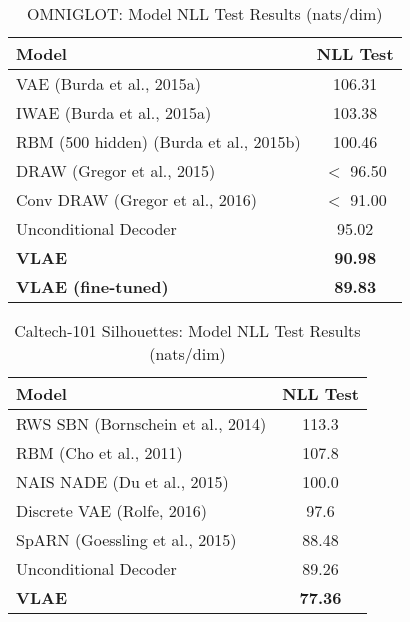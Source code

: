 \documentclass[12pt]{article}
\begin{document}
\begin{table}[H]
    \centering
    \caption{OMNIGLOT: Model NLL Test Results (nats/dim)}
    \label{tab:omniglot}
    \begin{tabular}{lc}
    \toprule
    \textbf{Model} & \textbf{NLL Test} \\
    \midrule
    VAE (Burda et al., 2015a) & 106.31 \\
    IWAE (Burda et al., 2015a) & 103.38 \\
    RBM (500 hidden) (Burda et al., 2015b) & 100.46 \\
    DRAW (Gregor et al., 2015) & $<$ 96.50 \\
    Conv DRAW (Gregor et al., 2016) & $<$ 91.00 \\
    Unconditional Decoder & 95.02 \\
    \textbf{VLAE} & \textbf{90.98} \\
    \textbf{VLAE (fine-tuned)} & \textbf{89.83} \\
    \bottomrule
    \end{tabular}
\end{table}

\begin{table}[H]
    \centering
    \caption{Caltech-101 Silhouettes: Model NLL Test Results (nats/dim)}
    \label{tab:caltech}
    \begin{tabular}{lc}
    \toprule
    \textbf{Model} & \textbf{NLL Test} \\
    \midrule
    RWS SBN (Bornschein et al., 2014) & 113.3 \\
    RBM (Cho et al., 2011) & 107.8 \\
    NAIS NADE (Du et al., 2015) & 100.0 \\
    Discrete VAE (Rolfe, 2016) & 97.6 \\
    SpARN (Goessling et al., 2015) & 88.48 \\
    Unconditional Decoder & 89.26 \\
    \textbf{VLAE} & \textbf{77.36} \\
    \bottomrule
    \end{tabular}
\end{table}
\end{document}
